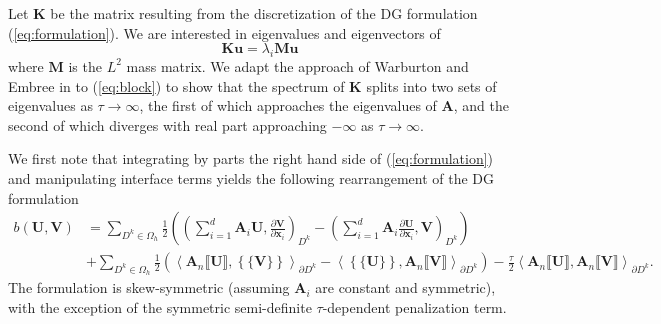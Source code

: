 \documentclass[preprint,10pt]{elsarticle}
\newcommand{\pd}[2]{\frac{\partial#1}{\partial#2}}
\newcommand{\LRp}[1]{\left( #1 \right)}
\newcommand{\LRa}[1]{\left\langle #1 \right\rangle}
\newcommand{\LRc}[1]{\left\{ #1 \right\}}
\newcommand{\jump}[1] {\ensuremath{\llbracket#1\rrbracket}}
\newcommand{\avg}[1] {\ensuremath{\LRc{\!\{#1\}\!}}}
\newcommand{\Oh}{\Omega_h}
\newcommand{\note}[1]{#1}
\begin{document}
Let $\bm{K}$ be the matrix resulting from the discretization of the DG formulation (\ref{eq:formulation}).  We are interested in eigenvalues and eigenvectors of 
\[
\bm{K}\bm{u} = \lambda_i\bm{M}\bm{u}
\]
where $\bm{M}$ is the $L^2$ mass matrix.  We adapt the approach of Warburton and Embree in \cite{Warburton20063205} to (\ref{eq:block}) to show that the \note{spectrum} of $\bm{K}$ splits into two sets of eigenvalues as $\tau\rightarrow \infty$, the first of which approaches the eigenvalues of $\bm{A}$, and the second of which diverges with real part approaching $-\infty$ as $\tau\rightarrow \infty$.  

\note{We first note that integrating by parts the right hand side of (\ref{eq:formulation}) and manipulating interface terms yields the following rearrangement of the DG formulation
\begin{align}
b(\bm{U},\bm{V}) &=\sum_{D^k\in \Oh} \frac{1}{2}\LRp{ \LRp{\sum_{i=1}^d\bm{A}_i\bm{U}, \pd{\bm{V}}{\bm{x}_i}}_{D^k} - \LRp{\sum_{i=1}^d\bm{A}_i \pd{\bm{U}}{\bm{x}_i}, {\bm{V}}}_{D^k}} \label{eq:dgformskew}\\
&+ \sum_{D^k\in \Oh}\frac{1}{2}\LRp{\LRa{\bm{A}_n\jump{\bm{U}}, \avg{\bm{V}}}_{\partial D^k}-\LRa{\avg{\bm{U}}, \bm{A}_n\jump{\bm{V}}}_{\partial D^k}} - \frac{\tau}{2}\LRa{\bm{A}_n\jump{\bm{U}},\bm{A}_n\jump{\bm{V}}}_{\partial D^k}.
\nonumber
\end{align}
The formulation is skew-symmetric (assuming $\bm{A}_i$ are constant and symmetric), with the exception of the symmetric semi-definite $\tau$-dependent penalization term.}
\end{document}
